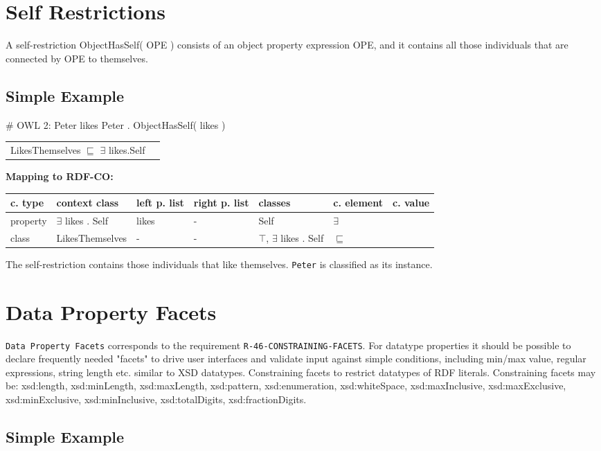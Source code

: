 \documentclass{llncs}
\newcommand{\ms}[1]{\texttt{#1}}
\newenvironment{gcotable}{
  \scriptsize
  \sffamily
  \vspace{0cm}
	\begin{center}
	\textbf{\vspace{0.4cm}Mapping to RDF-CO:} \\
  \begin{tabular}{l|l|l|l|l|l|l}
	\hline
  \textbf{c. type} & \textbf{context class} & \textbf{left p. list} & \textbf{right p. list} & \textbf{classes} & \textbf{c. element} & \textbf{c. value} \\
  \hline

}{
  \hline
  \end{tabular}
	\end{center}
}
\newenvironment{DL}{
  \vspace{0cm}
	\begin{center}
  \begin{tabular}{r l}

}{
  \end{tabular}
	\end{center}
}
\begin{document}
\section{Self Restrictions}

A self-restriction ObjectHasSelf( OPE ) consists of an object property expression OPE, and it contains all those individuals that are connected by OPE to themselves. 

\subsection{Simple Example}

\begin{ex}
# OWL 2:
Peter likes Peter . 
ObjectHasSelf( likes ) 
\end{ex}

\begin{DL}
LikesThemselves $\sqsubseteq$ $\exists$ likes.Self
\end{DL}

\begin{gcotable}
property & $\exists$ likes . Self & likes & - & Self & $\exists$ \\
class & LikesThemselves & - & - & $\top$, $\exists$ likes . Self & $\sqsubseteq$ \\
\end{gcotable}

The self-restriction contains those individuals that like themselves.
\ms{Peter} is classified as its instance.

\section{Data Property Facets}

\ms{Data Property Facets} corresponds to the requirement
\ms{R-46-CONSTRAINING-FACETS}.
For datatype properties it should be possible to declare frequently needed "facets" to drive user interfaces and validate input against simple conditions, including min/max value, regular expressions, string length etc. similar to XSD datatypes. 
Constraining facets to restrict datatypes of RDF literals.
Constraining facets may be: xsd:length, xsd:minLength, xsd:maxLength, xsd:pattern, xsd:enumeration, xsd:whiteSpace, xsd:maxInclusive, xsd:maxExclusive, xsd:minExclusive, xsd:minInclusive, xsd:totalDigits, xsd:fractionDigits.

\subsection{Simple Example}
\end{document}
